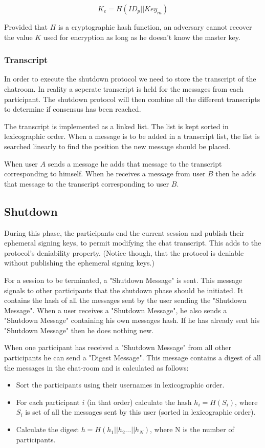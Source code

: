 \[
    K_e = H(ID_p || Key_m)
\]

Provided that $H$ is a cryptographic hash function, an adversary cannot recover
the value $K$ used for encryption as long as he doesn't know the master key.

\subsubsection{Transcript}
In order to execute the shutdown protocol we need to store the transcript of the chatroom.
In reality a seperate transcript is held for the messages from each participant.
The shutdown protocol will then combine all the different transcripts to determine if consensus has been reached.

The transcript is implemented as a linked list. The list is kept sorted in lexicographic order.
When a message is to be added in a transcript list, the list is searched linearly to find the position the new message should be placed.

When user $A$ sends a message he adds that message to the transcript corresponding to himself.
When he receives a message from user $B$ then he adds that message to the transcript corresponding to user $B$.

\subsection{Shutdown}
\label{subsections:shutdown}
During this phase, the participants end the current session and publish their
ephemeral signing keys, to permit modifying the chat transcript. This adds to
the protocol's deniability property. (Notice though, that the protocol is
deniable without publishing the ephemeral signing keys.)

For a session to be terminated, a "Shutdown Message" is sent.
This message signals to other participants that the shutdown phase should be initiated.
It contains the  hash of all the messages sent by the user sending the "Shutdown Message".
When a user receives a "Shutdown Message", he also sends a "Shutdown Message" containing his own messages hash.
If he has already sent his "Shutdown Message" then he does nothing new.

When one participant has received a "Shutdown Message" from all other participants he can send a "Digest Message".
This message contains a digest of all the messages in the chat-room and is calculated as follows:
\begin{itemize}
  \item[] Sort the participants using their usernames in lexicographic order.
  \item[] For each participant $i$ (in that order) calculate the hash $h_i = H(S_i)$, where $S_i$ is set of all the messages sent by this user (sorted in lexicographic order).
  \item[] Calculate the digest $h = H(h_1 || h_2 \dots || h_N)$, where N is the number of participants.
\end{itemize}


